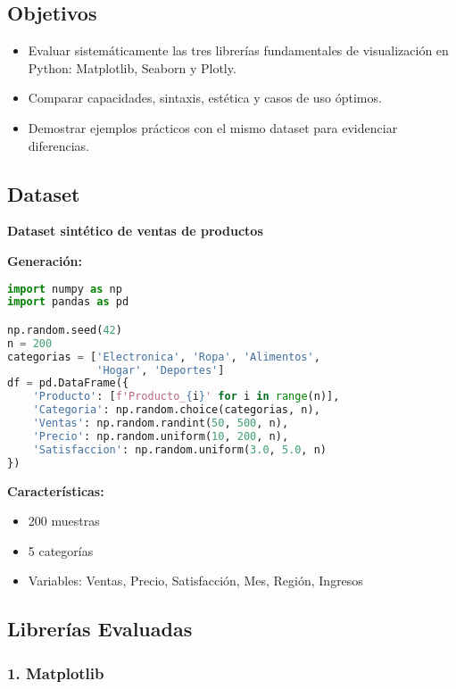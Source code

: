 \documentclass[12pt]{src/formato_utem}
\begin{document}
\subsection{Objetivos}

\begin{itemize}
    \item Evaluar sistemáticamente las tres librerías fundamentales de visualización en Python: Matplotlib, Seaborn y Plotly.
    \item Comparar capacidades, sintaxis, estética y casos de uso óptimos.
    \item Demostrar ejemplos prácticos con el mismo dataset para evidenciar diferencias.
\end{itemize}

\subsection{Dataset}

\textbf{Dataset sintético de ventas de productos}

\textbf{Generación:}
\begin{lstlisting}[language=Python]
import numpy as np
import pandas as pd

np.random.seed(42)
n = 200
categorias = ['Electronica', 'Ropa', 'Alimentos', 
              'Hogar', 'Deportes']
df = pd.DataFrame({
    'Producto': [f'Producto_{i}' for i in range(n)],
    'Categoria': np.random.choice(categorias, n),
    'Ventas': np.random.randint(50, 500, n),
    'Precio': np.random.uniform(10, 200, n),
    'Satisfaccion': np.random.uniform(3.0, 5.0, n)
})
\end{lstlisting}

\textbf{Características:}
\begin{itemize}
    \item 200 muestras
    \item 5 categorías
    \item Variables: Ventas, Precio, Satisfacción, Mes, Región, Ingresos
\end{itemize}

\subsection{Librerías Evaluadas}

\subsubsection{1. Matplotlib}
\end{document}

